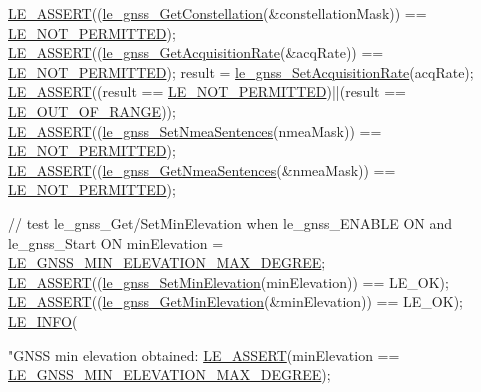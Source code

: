 \begin{DoxyCodeInclude}
{{{    \hyperlink{le__log_8h_ac0dbbef91dc0fed449d0092ff0557b39}{LE\_ASSERT}((\hyperlink{le__gnss__interface_8h_a150835481ab3751e3ab1821362e34e84}{le\_gnss\_GetConstellation}(&constellationMask)) == 
      \hyperlink{le__basics_8h_a1cca095ed6ebab24b57a636382a6c86cac6c0cac62213b786dabd7bf3e73bcec1}{LE\_NOT\_PERMITTED});
    \hyperlink{le__log_8h_ac0dbbef91dc0fed449d0092ff0557b39}{LE\_ASSERT}((\hyperlink{le__gnss__interface_8h_acfa9b25ac13f601921bd9123a1d0daba}{le\_gnss\_GetAcquisitionRate}(&acqRate)) == 
      \hyperlink{le__basics_8h_a1cca095ed6ebab24b57a636382a6c86cac6c0cac62213b786dabd7bf3e73bcec1}{LE\_NOT\_PERMITTED});
    result = \hyperlink{le__gnss__interface_8h_a75d96ec7ac6e0d6b58525e4c523d3b2c}{le\_gnss\_SetAcquisitionRate}(acqRate);
    \hyperlink{le__log_8h_ac0dbbef91dc0fed449d0092ff0557b39}{LE\_ASSERT}((result == \hyperlink{le__basics_8h_a1cca095ed6ebab24b57a636382a6c86cac6c0cac62213b786dabd7bf3e73bcec1}{LE\_NOT\_PERMITTED})||(result == 
      \hyperlink{le__basics_8h_a1cca095ed6ebab24b57a636382a6c86caef8ecf11fa8556fd2d3ca8faab697717}{LE\_OUT\_OF\_RANGE}));
    \hyperlink{le__log_8h_ac0dbbef91dc0fed449d0092ff0557b39}{LE\_ASSERT}((\hyperlink{le__gnss__interface_8h_ab9253e29d74cae6e962dcc8b94f0e3c1}{le\_gnss\_SetNmeaSentences}(nmeaMask)) == 
      \hyperlink{le__basics_8h_a1cca095ed6ebab24b57a636382a6c86cac6c0cac62213b786dabd7bf3e73bcec1}{LE\_NOT\_PERMITTED});
    \hyperlink{le__log_8h_ac0dbbef91dc0fed449d0092ff0557b39}{LE\_ASSERT}((\hyperlink{le__gnss__interface_8h_a985845ac33d35c34ac3099b6557ca8ea}{le\_gnss\_GetNmeaSentences}(&nmeaMask)) == 
      \hyperlink{le__basics_8h_a1cca095ed6ebab24b57a636382a6c86cac6c0cac62213b786dabd7bf3e73bcec1}{LE\_NOT\_PERMITTED});

    \textcolor{comment}{// test le\_gnss\_Get/SetMinElevation when le\_gnss\_ENABLE ON and le\_gnss\_Start ON}
    minElevation = \hyperlink{le__gnss__interface_8h_a572e640b32639643c838350241f99b22}{LE\_GNSS\_MIN\_ELEVATION\_MAX\_DEGREE};
    \hyperlink{le__log_8h_ac0dbbef91dc0fed449d0092ff0557b39}{LE\_ASSERT}((\hyperlink{le__gnss__interface_8h_a78982eb8669530eef1bbc79ff79347e4}{le\_gnss\_SetMinElevation}(minElevation)) == LE\_OK);
    \hyperlink{le__log_8h_ac0dbbef91dc0fed449d0092ff0557b39}{LE\_ASSERT}((\hyperlink{le__gnss__interface_8h_ad8476e020a2eb0188703e78eed5818da}{le\_gnss\_GetMinElevation}(&minElevation)) == LE\_OK);
    \hyperlink{le__log_8h_a23e6d206faa64f612045d688cdde5808}{LE\_INFO}(\textcolor{stringliteral}{"GNSS min elevation obtained: %
    \hyperlink{le__log_8h_ac0dbbef91dc0fed449d0092ff0557b39}{LE\_ASSERT}(minElevation == \hyperlink{le__gnss__interface_8h_a572e640b32639643c838350241f99b22}{LE\_GNSS\_MIN\_ELEVATION\_MAX\_DEGREE});

}}}}
\end{DoxyCodeInclude}
